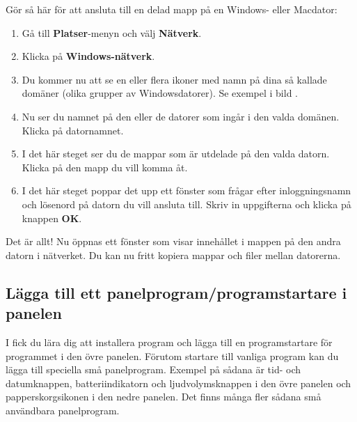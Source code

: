 \documentclass[a4paper,final]{memoir} %
\begin{document}
Gör så här för att ansluta till en delad mapp på en Windows- eller Macdator:

\begin{enumerate}

\item Gå till \textbf{Platser}-menyn och välj \textbf{Nätverk}.
\item Klicka på \textbf{Windows-nätverk}.
\item Du kommer nu att se en eller flera ikoner med namn på dina så kallade domäner (olika grupper av Windowsdatorer). Se exempel i bild .
\item Nu ser du namnet på den eller de datorer som ingår i den valda domänen. Klicka på datornamnet.
\item I det här steget ser du de mappar som är utdelade på den valda datorn. Klicka på den mapp du vill komma åt.
\item I det här steget poppar det upp ett fönster som frågar efter inloggningsnamn och lösenord på datorn du vill ansluta till. Skriv in uppgifterna och klicka på knappen \textbf{OK}.

\end{enumerate}




Det är allt! Nu öppnas ett fönster som visar innehållet i mappen på den andra datorn i nätverket. Du kan nu fritt kopiera mappar och filer mellan datorerna.



\subsection{Lägga till ett panelprogram/programstartare i panelen}


I  fick du lära dig att installera program och lägga till en programstartare för programmet i den övre panelen. Förutom startare till vanliga program kan du lägga till speciella små panelprogram. Exempel på sådana är tid- och datumknappen, batteriindikatorn och ljudvolymsknappen i den övre panelen och papperskorgsikonen i den nedre panelen. Det finns många fler sådana små användbara panelprogram. 
\end{document}
